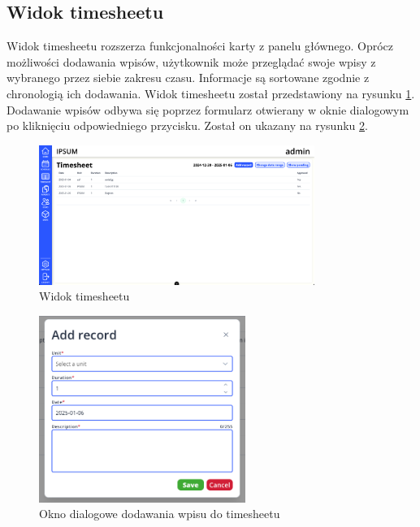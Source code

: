 \subsection{Widok timesheetu}

Widok timesheetu rozszerza funkcjonalności karty z panelu głównego. Oprócz możliwości dodawania wpisów, użytkownik może przeglądać swoje wpisy z wybranego przez siebie zakresu czasu. Informacje są sortowane zgodnie z chronologią ich dodawania. Widok timesheetu został przedstawiony na rysunku \ref{fig:timesheetView}. Dodawanie wpisów odbywa się poprzez formularz otwierany w oknie dialogowym po kliknięciu odpowiedniego przycisku. Został on ukazany na rysunku \ref{fig:timesheetDialog}.

\begin{figure}[H]
    \centering
    \includegraphics[width=0.8\textwidth, frame]{graf/front/timesheet.png}
    \caption{Widok timesheetu}
    \label{fig:timesheetView}
\end{figure}

\begin{figure}[H]
    \centering
    \includegraphics[width=0.6\textwidth]{graf/front/timesheetAddRecord.png}
    \caption{Okno dialogowe dodawania wpisu do timesheetu}
    \label{fig:timesheetDialog}
\end{figure}

